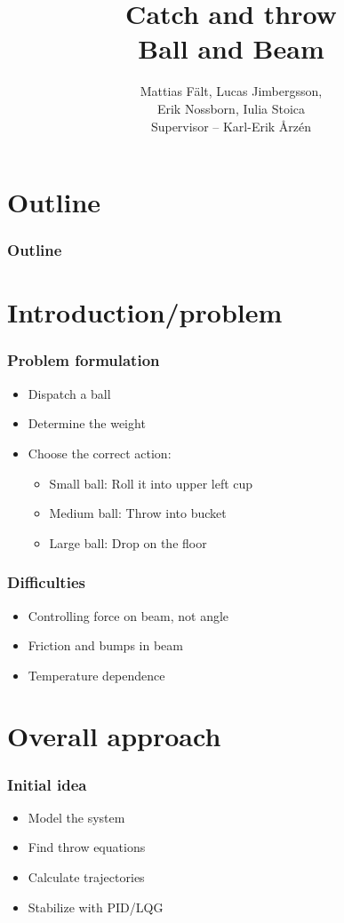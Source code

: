 \documentclass[
compress]
{beamer}
\title[Catch and Throw]{Catch and throw\\Ball and Beam}
\author[]{Mattias Fält, Lucas Jimbergsson,\\Erik Nossborn, Iulia Stoica\\\vspace{1em}Supervisor -- Karl-Erik Årz\'{e}n}
\begin{document}
\frame{\titlepage}

\section*{Outline}

\frame
{
  \frametitle{Outline}
  \tableofcontents%
}

\section{Introduction/problem}
\frame{\sectionpage}
\begin{frame}
\frametitle{Problem formulation}
\begin{itemize}
\item Dispatch a ball
\item Determine the weight
\item Choose the correct action:
\begin{itemize}
\item Small ball: Roll it into upper left cup
\item Medium ball: Throw into bucket
\item Large ball: Drop on the floor
\end{itemize}
\end{itemize}
\end{frame}


\begin{frame}
\frametitle{Difficulties}
\begin{itemize}
\item Controlling force on beam, not angle
\item Friction and bumps in beam
\item Temperature dependence
\end{itemize}
\end{frame}

\section{Overall approach}
\frame{\sectionpage}
\begin{frame}
\frametitle{Initial idea}
\begin{itemize}
\item Model the system
\item Find throw equations
\item Calculate trajectories
\item Stabilize with PID/LQG
\end{itemize}
\end{frame}
\end{document}
